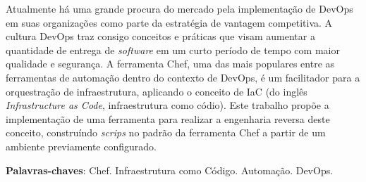 \begin{resumo}
  Atualmente há uma grande procura do mercado pela implementação de
  DevOps em suas organizações como parte da estratégia de vantagem
  competitiva. A cultura DevOps traz consigo conceitos e práticas
  que visam aumentar a quantidade de entrega de \textit{software} em um
  curto período de tempo com maior qualidade e segurança. A
  ferramenta Chef, uma das mais populares entre as ferramentas de
  automação dentro do contexto de DevOps, é um facilitador para
  a orquestração de infraestrutura, aplicando o conceito de
  IaC (do inglês \textit{Infrastructure as Code}, infraestrutura como códio). 
  Este trabalho propõe a implementação de uma ferramenta para realizar a 
  engenharia reversa deste conceito, construíndo \textit{scrips} no padrão da 
  ferramenta Chef a partir de um ambiente previamente configurado.


 \vspace{\onelineskip}
    
 \noindent
    \textbf{Palavras-chaves}: Chef. Infraestrutura como Código. Automação. DevOps.
\end{resumo}
